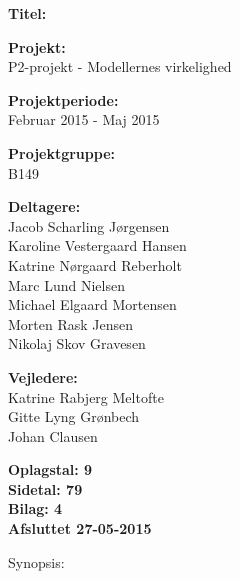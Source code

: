\begin{minipage}[t]{0.48\textwidth}
\textbf{Titel:} \\[5pt]\bigskip\hspace{2ex}


\textbf{Projekt:} \\[5pt]\bigskip\hspace{2ex}
P2-projekt - Modellernes virkelighed

\textbf{Projektperiode:} \\[5pt]\bigskip\hspace{2ex}
Februar 2015 - Maj 2015

\textbf{Projektgruppe:} \\[5pt]\bigskip\hspace{2ex}
B149

\textbf{Deltagere:} \\[5pt]\hspace*{2ex}
Jacob Scharling Jørgensen \\\hspace*{2ex}
Karoline Vestergaard Hansen \\\hspace*{2ex}
Katrine Nørgaard Reberholt \\\hspace*{2ex}
Marc Lund Nielsen \\\hspace*{2ex}
Michael Elgaard Mortensen \\\hspace*{2ex}
Morten Rask Jensen \\\hspace*{2ex}
Nikolaj Skov Gravesen \\\bigskip\hspace{2ex}

\textbf{Vejledere:} \\[5pt]\hspace*{2ex}
Katrine Rabjerg Meltofte \\\hspace*{2ex}
Gitte Lyng Grønbech \\\hspace*{2ex}
Johan Clausen \\\bigskip\hspace{2ex}

\vspace*{0.5cm}

\textbf{Oplagstal: 9} \\
\textbf{Sidetal: 79} \\
\textbf{Bilag: 4} \\ 
\textbf{Afsluttet 27-05-2015}

\end{minipage}
\hfill
\begin{minipage}[t]{0.483\textwidth}
Synopsis: \\[5pt]
\fbox{\parbox{7cm}{\bigskip\bigskip}}
\end{minipage}

